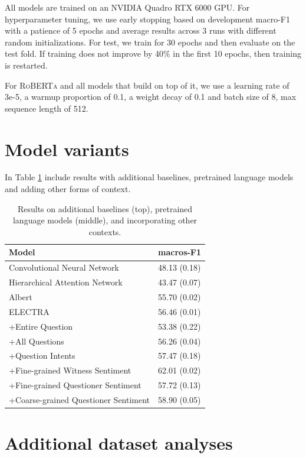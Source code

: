 All models are trained on an NVIDIA Quadro RTX 6000 GPU. For hyperparameter tuning, we use early stopping based on development macro-F1 with a patience of 5 epochs and average results across 3 runs with different random initializations. For test, we train for 30 epochs and then evaluate on the test fold. If training does not improve by 40\% in the first 10 epochs, then training is restarted.

For \textsc{RoBERTa} and all models that build on top of it, we use a learning rate of 3e-5, a warmup proportion of 0.1, a weight decay of 0.1 and batch size of 8, max sequence length of 512.

\section{Model variants}
\label{sec:app_variants}

In Table \ref{tab:other_models} include results with additional baselines, pretrained language models and adding other forms of context.

\begin{table}[t]
\centering
\small
\begin{tabular}{ll}
\toprule
Model & macros-F1\\
\midrule
Convolutional Neural Network &48.13 (0.18) \\
Hierarchical Attention Network &43.47 (0.07)\\
\midrule
Albert &55.70 (0.02)\\
ELECTRA &56.46 (0.01)\\
\midrule
+Entire Question &53.38 (0.22)\\
+All Questions &56.26 (0.04) \\
+Question Intents &57.47 (0.18)\\
+Fine-grained Witness Sentiment &62.01 (0.02)\\
+Fine-grained Questioner Sentiment &57.72 (0.13)\\
+Coarse-grained Questioner Sentiment &58.90 (0.05)\\
\bottomrule
\end{tabular}
\caption{Results on additional baselines (top), pretrained language models (middle), and incorporating other contexts.}
\label{tab:other_models}
\end{table}

\section{Additional dataset analyses}
\label{sec:app_lmi}

